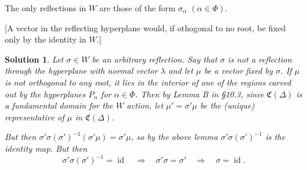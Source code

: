 \documentclass[12pt]{article}
\newenvironment{hwprob}[1]
{\renewcommand{\theprob}{#1}%
 \addtocounter{thm}{-1}%
 \begin{prob}}
{\end{prob}}
\theoremstyle{nonumberbreak}
\newtheorem{sol}{Solution}
\theoremstyle{changebreak}
\theoremstyle{nonumberbreak}
\theoremstyle{change}
\DeclareMathOperator{\id}{id}
\begin{document}
\begin{hwprob}{10.13}
	The only reflections in $W$ are those of the form $\sigma_\alpha$ $(\alpha\in\Phi)$.

	[A vector in the reflecting hyperplane would, if othogonal to no root, be fixed only by the identity in $W$.]
\end{hwprob}
\begin{sol}
	Let $\sigma\in W$ be an arbitrary reflection. Say that $\sigma$ is not a reflection through the hyperplane
	with normal vector $\lambda$ and let $\mu$ be a vector fixed by $\sigma$. If $\mu$ is not orthogonal to any root,
	it lies in the interior of one of the regions carved out by the hyperplanes $P_\alpha$ for $\alpha\in\Phi$. 
	Then by Lemma B in \S10.3, since $\mathfrak{C}(\Delta)$ is a fundamental domain for the $W$ action, let $\mu'=\sigma'\mu$
	be the (unique) representative of $\mu$ in $\mathfrak{C}(\Delta)$. 

	But then $\sigma'\sigma(\sigma')^{-1}(\sigma'\mu)=\sigma'\mu$, so by the above lemma $\sigma'\sigma(\sigma')^{-1}$
	is the identity map. But then 
	\[\sigma'\sigma(\sigma')^{-1}=\id\quad\Rightarrow\quad \sigma'\sigma=\sigma'\quad\Rightarrow\quad \sigma=\id.\]
\end{sol}
\end{document}
